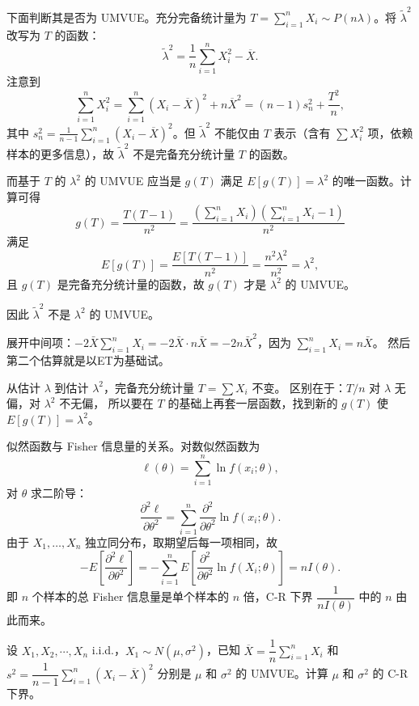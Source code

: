 \begin{solution}
下面判断其是否为 UMVUE。充分完备统计量为 $T = \sum_{i=1}^n X_i \sim P(n\lambda)$。将 $\tilde{\lambda}^2$ 改写为 $T$ 的函数：
\[
\tilde{\lambda}^2 = \frac{1}{n}\sum_{i=1}^n X_i^2 - \overline{X}.
\]
注意到
\[
\sum_{i=1}^n X_i^2 = \sum_{i=1}^n (X_i - \overline{X})^2 + n\overline{X}^2 = (n-1)s_n^2 + \frac{T^2}{n},
\]
其中 $s_n^2 = \frac{1}{n-1}\sum_{i=1}^n(X_i - \overline{X})^2$。但 $\tilde{\lambda}^2$ 不能仅由 $T$ 表示（含有 $\sum X_i^2$ 项，依赖样本的更多信息），故 $\tilde{\lambda}^2$ 不是完备充分统计量 $T$ 的函数。

而基于 $T$ 的 $\lambda^2$ 的 UMVUE 应当是 $g(T)$ 满足 $E[g(T)] = \lambda^2$ 的唯一函数。计算可得
\[
g(T) = \frac{T(T-1)}{n^2} = \frac{\left(\sum_{i=1}^n X_i\right)\left(\sum_{i=1}^n X_i - 1\right)}{n^2}
\]
满足
\[
E[g(T)] = \frac{E[T(T-1)]}{n^2} = \frac{n^2\lambda^2}{n^2} = \lambda^2,
\]
且 $g(T)$ 是完备充分统计量的函数，故 $g(T)$ 才是 $\lambda^2$ 的 UMVUE。

因此 $\tilde{\lambda}^2$ 不是 $\lambda^2$ 的 UMVUE。
\end{solution}
\begin{dxtips}
展开中间项：$-2\bar{X}\sum_{i=1}^n X_i = -2\bar{X} \cdot n\bar{X} = -2n\bar{X}^2$，因为 $\sum_{i=1}^n X_i = n\bar{X}$。
然后第二个估算就是以ET为基础试。
\end{dxtips}
\begin{dxtips}

从估计 $\lambda$ 到估计 $\lambda^2$，完备充分统计量 $T=\sum X_i$ 不变。
区别在于：$T/n$ 对 $\lambda$ 无偏，对 $\lambda^2$ 不无偏，
所以要在 $T$ 的基础上再套一层函数，找到新的 $g(T)$ 使 $E[g(T)]=\lambda^2$。

\end{dxtips}
\begin{dxtips}[fisher函数和似然函数的关系]
    
似然函数与 Fisher 信息量的关系。对数似然函数为
$$
\ell(\theta) = \sum_{i=1}^n \ln f(x_i;\theta),
$$
对 $\theta$ 求二阶导：
$$
\frac{\partial^2 \ell}{\partial\theta^2} = \sum_{i=1}^n \frac{\partial^2}{\partial\theta^2}\ln f(x_i;\theta).
$$
由于 $X_1,\ldots,X_n$ 独立同分布，取期望后每一项相同，故
$$
-E\left[\frac{\partial^2 \ell}{\partial\theta^2}\right] = -\sum_{i=1}^n E\left[\frac{\partial^2}{\partial\theta^2}\ln f(X_i;\theta)\right] = nI(\theta).
$$
即 $n$ 个样本的总 Fisher 信息量是单个样本的 $n$ 倍，C-R 下界 $\dfrac{1}{nI(\theta)}$ 中的 $n$ 由此而来。

\end{dxtips}
\begin{homework}[12]
设 $X_1, X_2, \cdots, X_n$ i.i.d.，$X_1 \sim N(\mu, \sigma^2)$，已知 $\overline{X} = \dfrac{1}{n}\sum_{i=1}^{n} X_i$ 和 $s^2 = \dfrac{1}{n-1}\sum_{i=1}^{n}(X_i - \overline{X})^2$ 分别是 $\mu$ 和 $\sigma^2$ 的 UMVUE。计算 $\mu$ 和 $\sigma^2$ 的 C-R 下界。
\end{homework}
